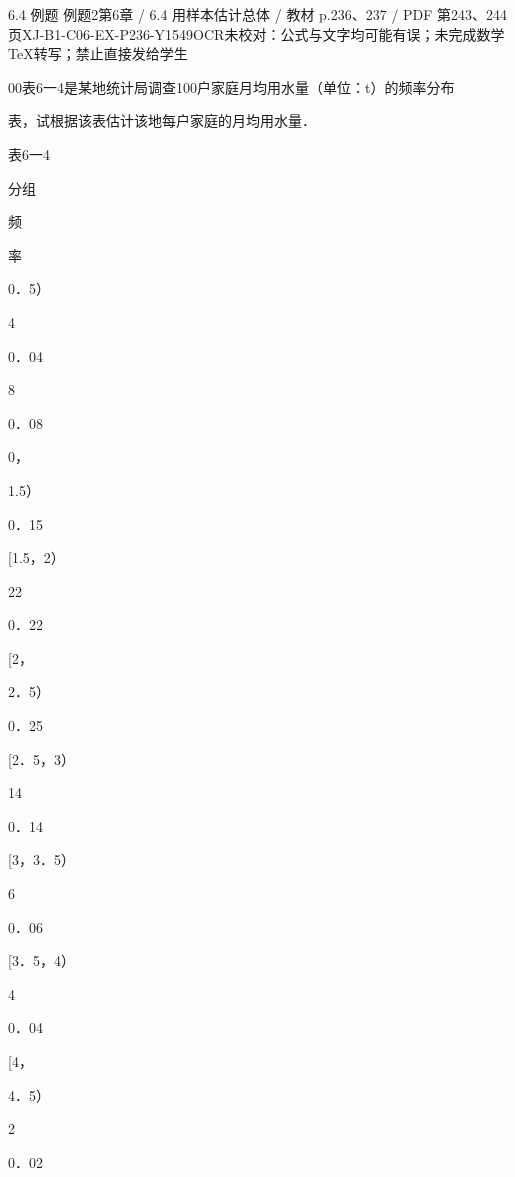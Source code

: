 \begin{bankitem}{6.4 例题 例题2}{第6章 / 6.4 用样本估计总体 / 教材 p.236、237 / PDF 第243、244页}{XJ-B1-C06-EX-P236-Y1549}{OCR未校对：公式与文字均可能有误；未完成数学TeX转写；禁止直接发给学生}
\begin{ocrdraft}
\par
00表6一4是某地统计局调查100户家庭月均用水量（单位：t）的频率分布
\par
表，试根据该表估计该地每户家庭的月均用水量．
\par
[教材p.237 / PDF第244页]
\par
表6一4
\par
分组
\par
频
\par
率
\par
0．5）
\par
4
\par
0．04
\par
8
\par
0．08
\par
0，
\par
1.5）
\par
0．15
\par
[1.5，2）
\par
22
\par
0．22
\par
[2，
\par
2．5）
\par
0．25
\par
[2．5，3）
\par
14
\par
0．14
\par
[3，3．5）
\par
6
\par
0．06
\par
[3．5，4）
\par
4
\par
0．04
\par
[4，
\par
4．5）
\par
2
\par
0．02
\par

\end{ocrdraft}
\end{bankitem}
